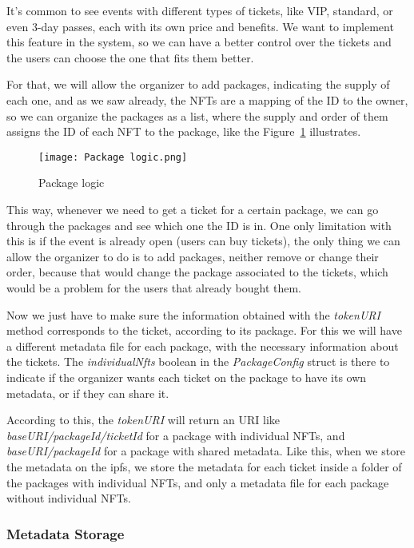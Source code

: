 It's common to see events with different types of tickets, like VIP, standard,
or even 3-day passes, each with its own price and benefits. We want to
implement this feature in the system, so we can have a better control over the
tickets and the users can choose the one that fits them better.

For that, we will allow the organizer to add packages, indicating the supply of
each one, and as we saw already, the NFTs are a mapping of the ID to the owner,
so we can organize the packages as a list, where the supply and order of them
assigns the ID of each NFT to the package, like the
Figure~\ref{fig:package_logic} illustrates.

\begin{figure}[H]
	\texttt{[image: Package logic.png]}
	\centering
	\caption{Package logic}\label{fig:package_logic}
\end{figure}

This way, whenever we need to get a ticket for a certain package, we can go
through the packages and see which one the ID is in. One only limitation with
this is if the event is already open (users can buy tickets), the only thing we
can allow the organizer to do is to add packages, neither remove or change
their order, because that would change the package associated to the tickets,
which would be a problem for the users that already bought them.

Now we just have to make sure the information obtained with the
\textit{tokenURI} method corresponds to the ticket, according to its package.
For this we will have a different metadata file for each package, with the
necessary information about the tickets. The \textit{individualNfts} boolean in
the \textit{PackageConfig} struct is there to indicate if the organizer wants
each ticket on the package to have its own metadata, or if they can share it.

According to this, the \textit{tokenURI} will return an URI like
\textit{baseURI/packageId/ticketId} for a package with individual NFTs, and
\textit{baseURI/packageId} for a package with shared metadata. Like this, when
we store the metadata on the \gls{ipfs}, we store the metadata for each ticket
inside a folder of the packages with individual NFTs, and only a metadata file
for each package without individual NFTs.

\subsubsection{Metadata Storage}\label{subsubsec:metadata_storage}

